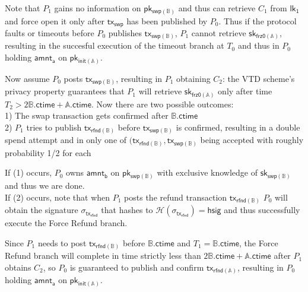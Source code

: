 \documentclass{article}      	%
\begin{document}
Note that $P_1$ gains no information on $\mathsf{pk_{swp(\mathbb{B})}}$ and thus can retrieve $C_1$ from $\mathsf{lk_1}$ and force open it only after $\mathsf{tx_{swp}}$ has been published by $P_0$. Thus if the protocol faults or timeouts before $P_0$ publishes $\mathsf{tx_{swp(\mathbb{B})}}$, $P_1$ cannot retrieve $\mathsf{sk_{frz0(\mathbb{A})}}$, resulting in the succesful execution of the timeout branch at $T_0$ and thus in $P_0$ holding $\mathsf{amnt_a}$ on $\mathsf{pk_{init(\mathbb{A})}}$. 

Now assume $P_0$ posts $\mathsf{tx_{swp(\mathbb{B})}}$, resulting in $P_1$ obtaining $C_2$: the VTD scheme's privacy property guarantees that $P_1$ will retrieve $\mathsf{sk_{frz0(\mathbb{A})}}$ only after time $T_2 > 2\mathbb{B}.\mathsf{ctime}  + \mathbb{A}.\mathsf{ctime}$. Now there are two possible outcomes: \\
1) The swap transaction gets confirmed after $\mathbb{B}.\mathsf{ctime}$  \\
2) $P_1$ tries to publish $\mathsf{tx_{rfnd(\mathbb{B})}}$ before $\mathsf{tx_{swp(\mathbb{B})}}$ is confirmed, resulting in a double spend attempt and in only one of $(\mathsf{tx_{rfnd(\mathbb{B})}}, \mathsf{tx_{swp(\mathbb{B})}}$ being accepted with roughly probability 1/2 for each

If (1) occurs, $P_0$ owns $\mathsf{amnt_b}$ on $\mathsf{pk_{swp(\mathbb{B})}}$ with exclusive knowledge of $\mathsf{sk_{swp(\mathbb{B})}}$ and thus we are done. \\
If (2) occurs, note that when $P_1$ posts the refund transaction $\mathsf{tx_{rfnd(\mathbb{B})}}$ $P_0$ will obtain the signature $\sigma_{\mathsf{tx_{rfnd}}}$ that hashes to $\mathcal{H}(\sigma_{\mathsf{tx_{rfnd}}}) = \mathsf{hsig}$  and thus successfully execute the Force Refund branch.

Since $P_1$ needs to post $\mathsf{tx_{rfnd(\mathbb{B})}}$ before $\mathbb{B}.\mathsf{ctime}$ and $T_1 = \mathbb{B}.\mathsf{ctime}$, the Force Refund branch will complete in time strictly less than $2\mathbb{B}.\mathsf{ctime} + \mathbb{A}.\mathsf{ctime}$ after $P_1$ obtains $C_2$, so $P_0$ is guaranteed to publish and confirm $\mathsf{tx_{rfnd(\mathbb{A})}}$, resulting in $P_0$ holding $\mathsf{amnt_a}$ on $\mathsf{pk_{init(\mathbb{A})}}$.
\end{document}
